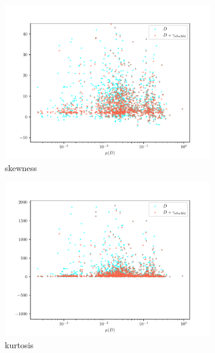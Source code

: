 \documentclass[12pt,a4paper,automark, toc=bib]{scrreprt}
\theoremstyle{definition}
\begin{document}
\begin{figure}
\begin{subfigure}{0.32\linewidth}
				\includegraphics[width=\linewidth]{figures/stat_sha384_0skew.pdf}
				\caption{skewness}
			\end{subfigure}
			\begin{subfigure}{0.32\linewidth}
				\includegraphics[width=\linewidth]{figures/stat_sha384_0kurtosis.pdf}
				\caption{kurtosis}
			\end{subfigure}
			\begin{subfigure}{0.32\linewidth}

\end{subfigure}
\end{figure}
\end{document}
